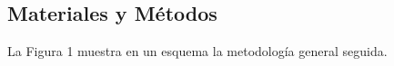 \documentclass[conference,10pt]{IEEEtran}
\begin{document}
\subsection{Materiales y Métodos}
La Figura 1 muestra en un esquema la metodología
general seguida.



\end{document}
